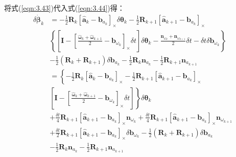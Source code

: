 将式(\ref{eqn:3.43})代入式(\ref{eqn:3.44})得：
\begin{equation}
\label{eqn:3.45}
\begin{aligned}
\delta \dot{\bm{\beta}}_{k} 
&= -\frac{1}{2} \mathbf{R}_{k}\left[\hat{\mathbf{a}}_{k} - \mathbf{b}_{a_{k}}\right]_\times \delta \bm{\theta}_{k}-\frac{1}{2} \mathbf{R}_{k+1}\left[\hat{\mathbf{a}}_{k+1}-\mathbf{b}_{a_{k}}\right]_\times \\
& \left\{\left[\mathbf{I}- \left[\frac{\hat{\bm{\omega}}_{k}+\hat{\bm{\omega}}_{k+1}}{2}-\mathbf{b}_{\omega_{k}}\right]_\times \delta t\right] \delta \bm{\theta}_{k} 
- \frac{\mathbf{n}_{\omega_{k}}+\mathbf{n}_{\omega_{k+1}}}{2} \delta t-\delta t \delta \mathbf{b}_{\omega_{k}}\right\} \\
& -\frac{1}{2}\left(\mathbf{R}_{k}+\mathbf{R}_{k+1}\right) \delta \mathbf{b}_{a_{k}}-\frac{1}{2} \mathbf{R}_{k} \mathbf{n}_{a_{k}}-\frac{1}{2} \mathbf{R}_{k+1} \mathbf{n}_{a_{k+1}} \\
&= \left\{-\frac{1}{2} \mathbf{R}_{k}\left[\hat{\mathbf{a}}_{k}-\mathbf{b}_{a_{k}}\right]_\times-\frac{1}{2} \mathbf{R}_{k+1}\left[\hat{\mathbf{a}}_{k+1}-\mathbf{b}_{a_{k}}\right]_\times\right. \\
& \left.\left[\mathbf{I}-\left[\frac{\hat{\bm{\omega}}_{k}+\hat{\bm{\omega}}_{k+1}}{2}-\mathbf{b}_{\omega_{k}}\right]_\times \delta t\right]\right\} \delta \bm{\theta}_{k} \\
& +\frac{\delta t}{4} \mathbf{R}_{k+1}\left[\hat{\mathbf{a}}_{k+1}-\mathbf{b}_{a_{k}}\right]_\times \mathbf{n}_{\omega_{k}}+\frac{\delta t}{4} \mathbf{R}_{k+1}\left[\hat{\mathbf{a}}_{k+1}-\mathbf{b}_{a_{k}}\right]_\times \mathbf{n}_{\omega_{k+1}} \\
&+ \frac{\delta t}{2} \mathbf{R}_{k+1}\left[\hat{\mathbf{a}}_{k+1}-\mathbf{b}_{a_{k}}\right]_\times \delta \mathbf{b}_{\omega_{k}} -\frac{1}{2}\left(\mathbf{R}_{k}+\mathbf{R}_{k+1}\right) \delta \mathbf{b}_{a_{k}} \\ 
&-\frac{1}{2} \mathbf{R}_{k} \mathbf{n}_{a_{k}}-\frac{1}{2} \mathbf{R}_{k+1} \mathbf{n}_{a_{k+1}}
\end{aligned}
\end{equation}

